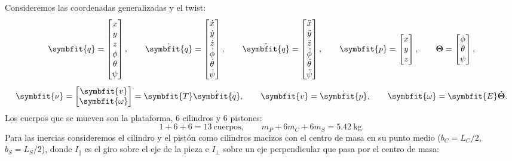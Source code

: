 \documentclass[11pt,a4paper]{article}
\numberwithin{equation}{section}
\newcommand{\vect}[1]{\symbfit{#1}}
\begin{document}
Consideremos las coordenadas generalizadas y el twist:
\begin{gather*}
\vect q = \begin{bmatrix}x\\ y\\ z\\ \phi\\ \theta\\ \psi\end{bmatrix},\qquad
\dot{\vect q} = \begin{bmatrix}\dot x\\ \dot y\\ \dot z\\ \dot\phi\\ \dot\theta\\ \dot\psi\end{bmatrix},\qquad
\ddot{\vect q} = \begin{bmatrix}\ddot x\\ \ddot y\\ \ddot z\\ \ddot\phi\\ \ddot\theta\\ \ddot\psi\end{bmatrix},\qquad
\vect p = \begin{bmatrix}x\\ y\\ z\end{bmatrix},\qquad
\boldsymbol\Theta = \begin{bmatrix}\phi\\ \theta\\ \psi\end{bmatrix},\\[4pt]
\vect\nu = \begin{bmatrix}\vect v\\ \vect\omega\end{bmatrix} = \vect T\dot{\vect q},\qquad
\vect v = \dot{\vect p},\qquad \vect\omega = \vect E\dot{\boldsymbol\Theta}.
\end{gather*}
Los cuerpos que se mueven son la plataforma, 6 cilindros y 6 pistones:
\begin{equation*}
1 + 6 + 6 = 13\ \text{cuerpos},\qquad m_P + 6m_C + 6m_S = 5.42\ \text{kg}.
\end{equation*}
Para las inercias consideremos el cilindro y el pistón como cilindros macizos con el centro de masa en su punto medio ($b_C = L_C/2$, $b_S = L_S/2$), donde $I_\parallel$ es el giro sobre el eje de la pieza e $I_\perp$ sobre un eje perpendicular que pasa por el centro de masa:
\end{document}
